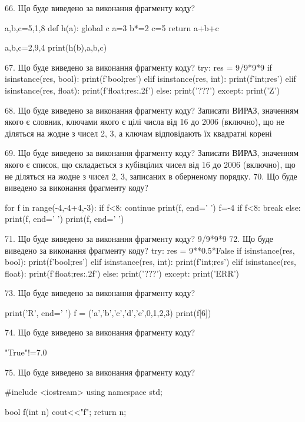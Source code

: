 \documentclass[11pt]{article}
\begin{document}
66. Що буде виведено за виконання фрагменту коду?

a,b,c=5,1,8
def h(a):
global c    a=3
    b*=2
    c=5
    return a+b+c

a,b,c=2,9,4
print(h(b),a,b,c)

67. Що буде виведено за виконання фрагменту коду?
try:
    res = 9/9*9*9
    if isinstance(res, bool):
        print(f'bool;{res}')
    elif isinstance(res, int):
        print(f'int;{res}')
    elif isinstance(res, float):
        print(f'float;{res:.2f}')
    else:
        print('???')
except:
    print('Z')

68. Що буде виведено за виконання фрагменту коду?
Записати ВИРАЗ, значенням якого є словник, ключами якого є цілі числа від 16 до 2006 (включно), що не діляться на жодне з чисел 2, 3, а ключам відповідають їх квадратні корені 

69. Що буде виведено за виконання фрагменту коду?
Записати ВИРАЗ, значенням якого є список, що складається з кубівцілих чисел від 16 до 2006 (включно), що не діляться на жодне з чисел 2, 3, записаних в оберненому порядку.
70. Що буде виведено за виконання фрагменту коду?

for f in range(-4,-4+4,-3):
    if f<8:
        continue
    print(f, end=' ')
    f=-4
    if f<8:
        break
else:
    print(f, end=' ')
print(f, end=' ')

71. Що буде виведено за виконання фрагменту коду?
9/9*9*9
72. Що буде виведено за виконання фрагменту коду?
try:
    res = 9**0.5*False
    if isinstance(res, bool):
        print(f'bool;{res}')
    elif isinstance(res, int):
        print(f'int;{res}')
    elif isinstance(res, float):
        print(f'float;{res:.2f}')
    else:
        print('???')
except:
    print('ERR')

73. Що буде виведено за виконання фрагменту коду?

print('R', end=' ')
f = ('a','b','c','d','e',0,1,2,3)
print(f[6])


74. Що буде виведено за виконання фрагменту коду?

"True"!=7.0

75. Що буде виведено за виконання фрагменту коду?

#include <iostream>
using namespace std;

bool f(int n){
    cout<<"f";
    return n;
}
\end{document}
